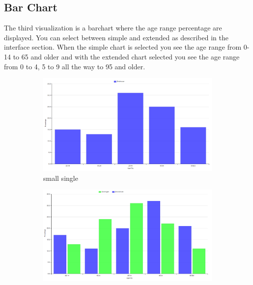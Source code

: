 \documentclass[a4paper,twoside,11pt]{article}
\begin{document}
\subsection{Bar Chart}
The third visualization is a barchart where the age range percentage are displayed. You can select between simple and extended as described in the interface section. When the simple chart is selected you see the age range from 0-14 to 65 and older and with the extended chart selected you see the age range from 0 to 4, 5 to 9 all the way to 95 and older. \newline
\newline
\begin{figure}
        \begin{subfigure}[b]{0.23\textwidth}
                \includegraphics[width=\textwidth]{Visualization/BarChartSimpleSingle.png}
                \caption{small single}
                \label{fig:smallSingle}
        \end{subfigure}
        \begin{subfigure}[b]{0.23\textwidth}
                \includegraphics[width=\textwidth]{Visualization/BarChartSimpleFull.png}

\end{subfigure}
\end{figure}
\end{document}
